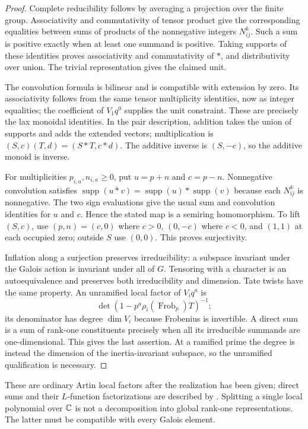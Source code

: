 \begin{proof}
Complete reducibility follows by averaging a projection over the finite group. Associativity and commutativity of tensor product give the corresponding equalities between sums of products of the nonnegative integers $N_{ij}^k$. Such a sum is positive exactly when at least one summand is positive. Taking supports of these identities proves associativity and commutativity of $*$, and distributivity over union. The trivial representation gives the claimed unit.

The convolution formula is bilinear and is compatible with extension by zero. Its associativity follows from the same tensor multiplicity identities, now as integer equalities; the coefficient of $V_1q^0$ supplies the unit constraint. These are precisely the lax monoidal identities. In the pair description, addition takes the union of supports and adds the extended vectors; multiplication is $(S,c)(T,d)=(S*T,c*d)$. The additive inverse is $(S,-c)$, so the additive monoid is inverse.

For multiplicities $p_{i,a},n_{i,a}\ge0$, put $u=p+n$ and $c=p-n$. Nonnegative convolution satisfies $\operatorname{supp}(u*v)=\operatorname{supp}(u)*\operatorname{supp}(v)$ because each $N_{ij}^k$ is nonnegative. The two sign evaluations give the usual sum and convolution identities for $u$ and $c$. Hence the stated map is a semiring homomorphism. To lift $(S,c)$, use $(p,n)=(c,0)$ where $c>0$, $(0,-c)$ where $c<0$, and $(1,1)$ at each occupied zero; outside $S$ use $(0,0)$. This proves surjectivity.

Inflation along a surjection preserves irreducibility: a subspace invariant under the Galois action is invariant under all of $G$. Tensoring with a character is an autoequivalence and preserves both irreducibility and dimension. Tate twists have the same property. An unramified local factor of $V_iq^a$ is
\[
 \det(1-p^a\rho_i(\operatorname{Frob}_p)T)^{-1};
\]
its denominator has degree $\dim V_i$ because Frobenius is invertible. A direct sum is a sum of rank-one constituents precisely when all its irreducible summands are one-dimensional. This gives the last assertion. At a ramified prime the degree is instead the dimension of the inertia-invariant subspace, so the unramified qualification is necessary.
\end{proof}

These are ordinary Artin local factors after the realization has been given; direct sums and their $L$-function factorizations are described by \citet[Remark 1.4, p.\ 203]{Sutherland}. Splitting a single local polynomial over $\mathbb C$ is not a decomposition into global rank-one representations. The latter must be compatible with every Galois element.

